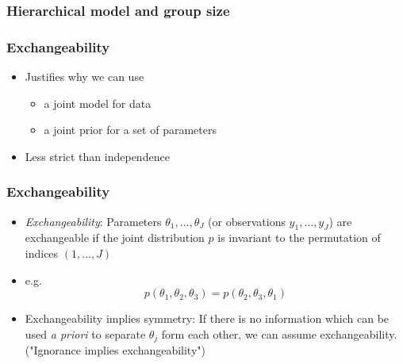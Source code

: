 \documentclass[10pt]{beamer}
\begin{document}
\begin{frame}

\frametitle{Hierarchical model and group size}


\end{frame}

\begin{frame}

\frametitle{Exchangeability}

  \begin{itemize}
  \item Justifies why we can use
    \begin{itemize}
    \item a joint model for data
    \item a joint prior for a set of parameters
    \end{itemize}
  \item Less strict than independence
  \end{itemize}
\end{frame}

\begin{frame}

\frametitle{Exchangeability}

  \begin{itemize}
  \item \textit{Exchangeability}: Parameters
    $\theta_1,\ldots,\theta_J$ (or observations $y_1,\ldots,y_J$) are
    exchangeable if the joint distribution $p$ is invariant to the
    permutation of indices $(1,\ldots,J)$
  \item e.g.
    \begin{equation*}
      p(\theta_1,\theta_2,\theta_3) = p(\theta_2,\theta_3,\theta_1)
    \end{equation*}

  \item Exchangeability implies symmetry: If there is no information
    which can be used \textit{a priori} to separate $\theta_j$ form
    each other, we can assume exchangeability. ("Ignorance implies
    exchangeability")

  \end{itemize}
\end{frame}
\end{document}
